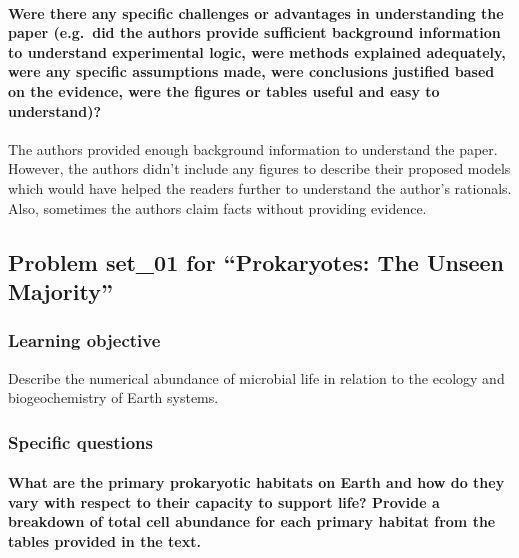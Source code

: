 \documentclass[]{article}
\let\oldparagraph\paragraph
\renewcommand{\paragraph}[1]{\oldparagraph{#1}\mbox{}}
\begin{document}
\paragraph{Were there any specific challenges or advantages in
understanding the paper (e.g.~did the authors provide sufficient
background information to understand experimental logic, were methods
explained adequately, were any specific assumptions made, were
conclusions justified based on the evidence, were the figures or tables
useful and easy to
understand)?}\label{were-there-any-specific-challenges-or-advantages-in-understanding-the-paper-e.g.did-the-authors-provide-sufficient-background-information-to-understand-experimental-logic-were-methods-explained-adequately-were-any-specific-assumptions-made-were-conclusions-justified-based-on-the-evidence-were-the-figures-or-tables-useful-and-easy-to-understand-1}

The authors provided enough background information to understand the
paper. However, the authors didn't include any figures to describe their
proposed models which would have helped the readers further to
understand the author's rationals. Also, sometimes the authors claim
facts without providing evidence.

\subsection{\texorpdfstring{Problem set\_01 for ``Prokaryotes: The
Unseen
Majority''}{Problem set\_01 for Prokaryotes: The Unseen Majority}}\label{problem-set_01-for-prokaryotes-the-unseen-majority}

\subsubsection{Learning objective}\label{learning-objective}

Describe the numerical abundance of microbial life in relation to the
ecology and biogeochemistry of Earth systems.

\subsubsection{Specific questions}\label{specific-questions-1}

\paragraph{What are the primary prokaryotic habitats on Earth and how do
they vary with respect to their capacity to support life? Provide a
breakdown of total cell abundance for each primary habitat from the
tables provided in the
text.}\label{what-are-the-primary-prokaryotic-habitats-on-earth-and-how-do-they-vary-with-respect-to-their-capacity-to-support-life-provide-a-breakdown-of-total-cell-abundance-for-each-primary-habitat-from-the-tables-provided-in-the-text.}
\end{document}

